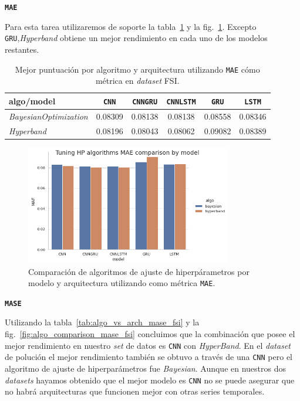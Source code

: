 \documentclass[a4paper,12pt]{article}
\begin{document}
\textbf{\texttt{MAE}}

Para esta tarea utilizaremos de soporte la tabla~\ref{tab:algo_vs_arch_mae_fsi} y la fig.~\ref{fig:algo_comparison_mae_fsi}. Excepto \texttt{GRU},\textit{Hyperband} obtiene un mejor rendimiento en cada uno de los modelos restantes.

\begin{table}[H]
\centering
\begin{tabular}{l|ccccc}
\hline
algo/model & \texttt{CNN} & \texttt{CNNGRU} & \texttt{CNNLSTM} & \texttt{GRU} & \texttt{LSTM} \\ \hline
\textit{BayesianOptimization}         & 0.08309     & 0.08138        & 0.08138         & 0.08558     & 0.08346      \\
\textit{Hyperband}         & 0.08196     & 0.08043        & 0.08062         & 0.09082     & 0.08389      \\ \hline
\end{tabular}
\caption{Mejor puntuación por algoritmo y arquitectura utilizando \texttt{MAE} cómo métrica en \textit{dataset} FSI.}
\label{tab:algo_vs_arch_mae_fsi}
\end{table}

\begin{figure}[H]
	\begin{center}
	\includegraphics[width=0.8\textwidth]{model_vs_algo_hp_mae_fsi.png}
  	\caption{Comparación de algoritmos de ajuste de hiperpárametros por modelo y arquitectura utilizando como métrica \texttt{MAE}.}
  	\label{fig:algo_comparison_mae_fsi}
  	\end{center}
\end{figure}

\textbf{\texttt{MASE}}

Utilizando la tabla~\ref{tab:algo_vs_arch_mase_fsi} y la fig.~\ref{fig:algo_comparison_mase_fsi} concluimos que la combinación que posee el mejor rendimiento en nuestro \textit{set} de datos es \texttt{CNN} con \textit{HyperBand}. En el \textit{dataset} de polución el mejor rendimiento también se obtuvo a través de una \texttt{CNN} pero el algoritmo de ajuste de hiperparámetros fue \textit{Bayesian}. Aunque en nuestros dos \textit{datasets} hayamos obtenido que el mejor modelo es \texttt{CNN} no se puede asegurar que no habrá arquitecturas que funcionen mejor con otras series temporales.
\end{document}
